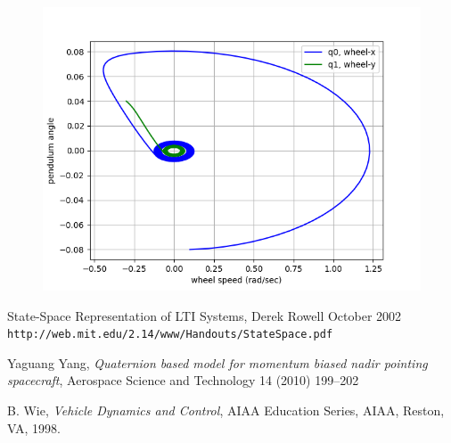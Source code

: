 \documentclass{article}
\begin{document}
\begin{figure}
\centering
\includegraphics[width=1\linewidth]{parametric_default}
\end{figure}

\begin{thebibliography}{9}
State-Space Representation of LTI Systems, Derek Rowell October 2002
\\\texttt{http://web.mit.edu/2.14/www/Handouts/StateSpace.pdf}

Yaguang Yang,
\textit{Quaternion based model for momentum biased nadir pointing spacecraft}, 
Aerospace Science and Technology 14 (2010) 199–202

B. Wie, 
\textit{Vehicle Dynamics and Control}, 
AIAA Education Series, AIAA, Reston, VA, 1998.
\end{thebibliography}
\end{document}
